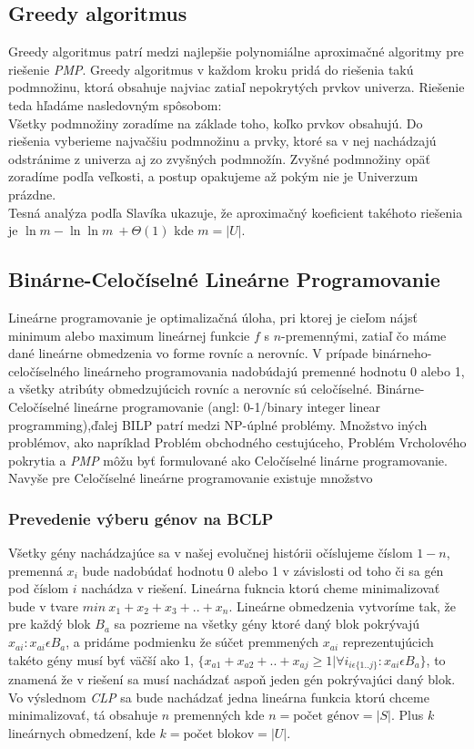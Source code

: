 \subsection{Greedy algoritmus}
Greedy algoritmus patrí medzi najlepšie polynomiálne aproximačné algoritmy pre riešenie \emph{PMP}.\cite{Slavik}
Greedy algoritmus v každom kroku pridá do riešenia takú podmnožinu,
ktorá obsahuje najviac zatiaľ nepokrytých prvkov univerza. Riešenie teda hľadáme nasledovným spôsobom:\\
Všetky podmnožiny zoradíme na základe toho, koľko prvkov obsahujú.
Do riešenia vyberieme najvačšiu podmnožinu a prvky, ktoré sa v nej nachádzajú odstránime z
univerza aj zo zvyšných podmnožín. Zvyšné podmnožiny opäť zoradíme podľa veľkosti,
a postup opakujeme až pokým nie je Univerzum prázdne.\\
Tesná analýza podľa Slavíka ukazuje, že aproximačný koeficient takéhoto riešenia je \(\ln m - \ln \ln m\ +\Theta(1) \) \cite{Slavik} 
kde \(m = |U|\).
\subsection{Binárne-Celočíselné Lineárne Programovanie}
Lineárne programovanie je optimalizačná úloha, pri ktorej je cieľom nájsť minimum alebo
maximum lineárnej funkcie $f$ s $n$-premennými, zatiaľ čo máme dané lineárne obmedzenia vo forme rovníc a nerovníc.
V prípade binárneho-celočíselného lineárneho programovania nadobúdajú premenné hodnotu 0 alebo 1,
a všetky atribúty obmedzujúcich rovníc a nerovníc sú celočíselné.
Binárne-Celočíselné lineárne programovanie (angl: 0-1/binary integer linear programming),ďalej BILP patrí medzi NP-úplné problémy.\cite{Karp}
Množstvo iných problémov, ako napríklad Problém obchodného cestujúceho, Problém Vrcholového pokrytia a \emph{PMP} môžu byť formulované ako Celočíselné linárne programovanie.
Navyše pre Celočíselné lineárne programovanie existuje množstvo 
\subsubsection{Prevedenie výberu génov na BCLP}
Všetky gény nachádzajúce sa v našej evolučnej histórii očíslujeme číslom $1-n$, 
premenná $x_i$ bude nadobúdať hodnotu 0 alebo 1 v závislosti od toho či sa gén pod číslom $i$ nachádza v riešení.
Lineárna fukncia ktorú cheme minimalizovať bude v tvare $min\ x_1 + x_2 +x_3 + .. +x_n$. Lineárne obmedzenia vytvoríme tak,
že pre každý blok $B_a$ sa pozrieme na všetky gény ktoré daný blok pokrývajú $x_{ai}:x_{ai} \epsilon B_a$,
a pridáme podmienku že súčet premmených $x_{ai}$ reprezentujúcich takéto gény musí byť väčší ako 1,
\( \{x_{a1}+x_{a2}+..+x_{aj} \geq 1|\forall i_{i\epsilon \{1..j\}}:x_{ai}\epsilon B_a \}\),
to znamená že v riešení sa musí nachádzať aspoň jeden gén pokrývajúci daný blok.
Vo výslednom \emph{CLP} sa bude nachádzať jedna lineárna funkcia ktorú chceme minimalizovať, tá obsahuje $n$ premenných kde \(n=\text{počet génov}=|S|\).
Plus $k$ lineárnych obmedzení, kde \(k=\text{počet blokov}=|U|\).
